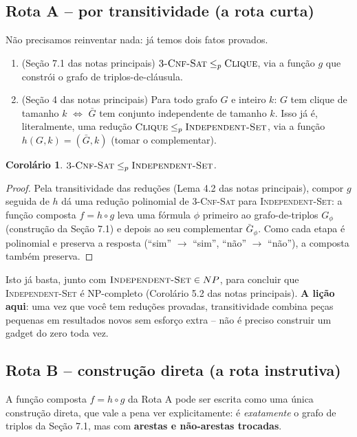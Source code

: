 \documentclass[9pt,a4paper]{extarticle}
\newcommand{\impt}[1]{\textcolor{important}{\textbf{#1}}}
\newtheorem{corollary}[theorem]{Corolário}
\theoremstyle{definition}
\begin{document}
\subsection{Rota A -- por transitividade (a rota curta)}

Não precisamos reinventar nada: já temos dois fatos provados.

\begin{enumerate}
\item (Seção 7.1 das notas principais) \(\textsc{3-Cnf-Sat} \leq_p \textsc{Clique}\), via a função \(g\) que constrói o grafo de triplos-de-cláusula.
\item (Seção 4 das notas principais) Para todo grafo \(G\) e inteiro \(k\): \(G\) tem clique de tamanho \(k\) \(\iff\) \(\bar G\) tem conjunto independente de tamanho \(k\). Isso já é, literalmente, uma redução \(\textsc{Clique} \leq_p \textsc{Independent-Set}\), via a função \(h(G,k) = (\bar G, k)\) (tomar o complementar).
\end{enumerate}

\begin{corollary}\label{cor:rota-a}
\(\textsc{3-Cnf-Sat} \leq_p \textsc{Independent-Set}\).
\end{corollary}
\begin{proof}
Pela transitividade das reduções (Lema 4.2 das notas principais), compor \(g\) seguida de \(h\) dá uma redução polinomial de \textsc{3-Cnf-Sat} para \textsc{Independent-Set}: a função composta \(f = h \circ g\) leva uma fórmula \(\phi\) primeiro ao grafo-de-triplos \(G_\phi\) (construção da Seção 7.1) e depois ao seu complementar \(\bar G_\phi\). Como cada etapa é polinomial e preserva a resposta (\enquote{sim} \(\to\) \enquote{sim}, \enquote{não} \(\to\) \enquote{não}), a composta também preserva.
\end{proof}

Isto já basta, junto com \(\textsc{Independent-Set} \in NP\), para concluir que \textsc{Independent-Set} é NP-completo (Corolário 5.2 das notas principais). \impt{A lição aqui}: uma vez que você tem reduções provadas, transitividade combina peças pequenas em resultados novos sem esforço extra -- não é preciso construir um gadget do zero toda vez.

\subsection{Rota B -- construção direta (a rota instrutiva)}

A função composta \(f = h \circ g\) da Rota A pode ser escrita como uma única construção direta, que vale a pena ver explicitamente: é \emph{exatamente} o grafo de triplos da Seção 7.1, mas com \impt{arestas e não-arestas trocadas}.
\end{document}
